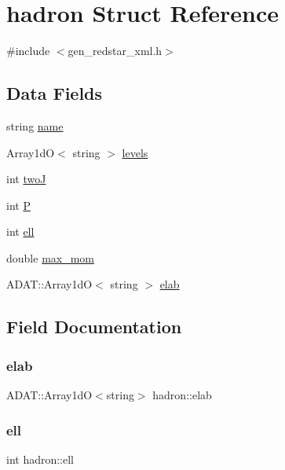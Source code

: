 \hypertarget{structhadron}{}\section{hadron Struct Reference}
\label{structhadron}


{\ttfamily \#include $<$gen\+\_\+redstar\+\_\+xml.\+h$>$}

\subsection*{Data Fields}
\begin{DoxyCompactItemize}
\item 
string \mbox{\hyperlink{structhadron_a1723945a53bf31a89bae3915bfed013c}{name}}
\item 
Array1dO$<$ string $>$ \mbox{\hyperlink{structhadron_a03809869ad25124ab0152666ea633315}{levels}}
\item 
int \mbox{\hyperlink{structhadron_ae190a1452b80921c1fc32bbfb805ae9d}{twoJ}}
\item 
int \mbox{\hyperlink{structhadron_a317d83c6257a8452f70b2251ec784715}{P}}
\item 
int \mbox{\hyperlink{structhadron_ab5599e4ac9df96aa6107af4412e51815}{ell}}
\item 
double \mbox{\hyperlink{structhadron_a668b950b7a48e196a051668114687d70}{max\+\_\+mom}}
\item 
A\+D\+A\+T\+::\+Array1dO$<$ string $>$ \mbox{\hyperlink{structhadron_a98c94f8e4f345d4fccfc19259faa9cc4}{elab}}
\end{DoxyCompactItemize}


\subsection{Field Documentation}
\mbox{\label{structhadron_a98c94f8e4f345d4fccfc19259faa9cc4}} 
\subsubsection{\texorpdfstring{elab}{elab}}
{\footnotesize\ttfamily A\+D\+A\+T\+::\+Array1dO$<$string$>$ hadron\+::elab}

\mbox{\label{structhadron_ab5599e4ac9df96aa6107af4412e51815}} 
\subsubsection{\texorpdfstring{ell}{ell}}
{\footnotesize\ttfamily int hadron\+::ell}

